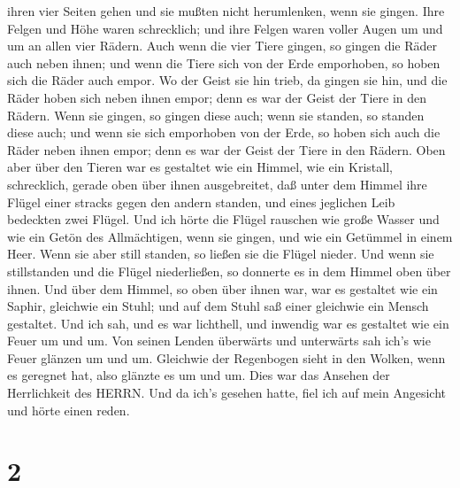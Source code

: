 ihren vier Seiten gehen und sie mußten nicht herumlenken, wenn sie
gingen.  Ihre Felgen und Höhe waren schrecklich; und ihre
Felgen waren voller Augen um und um an allen vier Rädern. 
Auch wenn die vier Tiere gingen, so gingen die Räder auch neben ihnen;
und wenn die Tiere sich von der Erde emporhoben, so hoben sich die Räder
auch empor.  Wo der Geist sie hin trieb, da gingen sie hin,
und die Räder hoben sich neben ihnen empor; denn es war der Geist der
Tiere in den Rädern.  Wenn sie gingen, so gingen diese
auch; wenn sie standen, so standen diese auch; und wenn sie sich
emporhoben von der Erde, so hoben sich auch die Räder neben ihnen empor;
denn es war der Geist der Tiere in den Rädern.  Oben aber
über den Tieren war es gestaltet wie ein Himmel, wie ein Kristall,
schrecklich, gerade oben über ihnen ausgebreitet,  daß
unter dem Himmel ihre Flügel einer stracks gegen den andern standen, und
eines jeglichen Leib bedeckten zwei Flügel.  Und ich hörte
die Flügel rauschen wie große Wasser und wie ein Getön des Allmächtigen,
wenn sie gingen, und wie ein Getümmel in einem Heer. Wenn sie aber still
standen, so ließen sie die Flügel nieder.  Und wenn sie
stillstanden und die Flügel niederließen, so donnerte es in dem Himmel
oben über ihnen.  Und über dem Himmel, so oben über ihnen
war, war es gestaltet wie ein Saphir, gleichwie ein Stuhl; und auf dem
Stuhl saß einer gleichwie ein Mensch gestaltet.  Und ich
sah, und es war lichthell, und inwendig war es gestaltet wie ein Feuer
um und um. Von seinen Lenden überwärts und unterwärts sah ich's wie
Feuer glänzen um und um.  Gleichwie der Regenbogen sieht in
den Wolken, wenn es geregnet hat, also glänzte es um und um. Dies war
das Ansehen der Herrlichkeit des HERRN. Und da ich's gesehen hatte, fiel
ich auf mein Angesicht und hörte einen reden.

\hypertarget{section-1}{%
\section{2}\label{section-1}}

